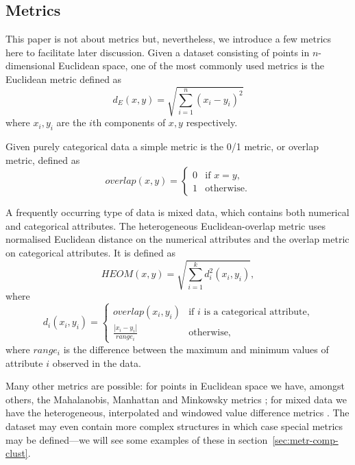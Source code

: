 \subsection{Metrics}
\label{sec:metrics}

This paper is not about metrics but, nevertheless, we introduce a few metrics
here to facilitate later discussion.  Given a dataset consisting of points in
$n$-dimensional Euclidean space, one of the most commonly used metrics is the
Euclidean metric defined as
\begin{equation*}
  d_{E}(x,y) = \sqrt{\sum_{i=1}^{n} (x_i-y_i)^2}
\end{equation*}
where $x_i,y_i$ are the $i$th components of $x,y$ respectively.

Given purely categorical data a simple metric is the 0/1 metric, or overlap
metric, defined as
\begin{equation*}
  overlap(x,y) =
  \begin{cases}
    0 & \text{if $x=y$,}\\
    1 & \text{otherwise.}
  \end{cases}
\end{equation*}

A frequently occurring type of data is mixed data, which contains both
numerical and categorical attributes.  The heterogeneous Euclidean-overlap
metric uses normalised Euclidean distance on the numerical attributes and the
overlap metric on categorical attributes.  It is defined as
\begin{equation*}
  HEOM(x,y) = \sqrt{\sum_{i=1}^{k} d_i^2(x_i,y_i)},
\end{equation*}
where
\begin{equation*}
  d_i(x_i,y_i) =
  \begin{cases}
    overlap(x_i,y_i) & \text{if $i$ is a categorical attribute,}\\
    \displaystyle \frac{|x_i-y_i|}{range_i} & \text{otherwise,}
  \end{cases}
\end{equation*}
where $range_i$ is the difference between the maximum and minimum values of
attribute $i$ observed in the data.

Many other metrics are possible: for points in Euclidean space we have,
amongst others, the Mahalanobis, Manhattan and Minkowsky metrics
\citep{jain-1999}; for mixed data we have the heterogeneous, interpolated and
windowed value difference metrics \citep{wilson97improvedheterogeneous}.  The
dataset may even contain more complex structures in which case special metrics
may be defined---we will see some examples of these in
section~\ref{sec:metr-comp-clust}.

